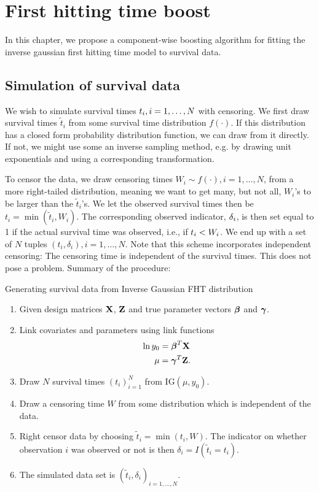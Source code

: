 \chapter{First hitting time boost}
In this chapter, we propose a component-wise boosting algorithm for fitting the inverse gaussian first hitting time model to survival data.

\section{Simulation of survival data}
We wish to simulate survival times $t_{i},i=1,\ldots,N$ with censoring. We first draw survival times $\tilde{t}_i$ from some survival time distribution $f(\cdot)$. If this distribution has a closed form probability distribution function, we can draw from it directly. If not, we might use some an inverse sampling method, e.g. by drawing unit exponentials and using a corresponding transformation.

To censor the data, we draw censoring times $W_i\sim f(\cdot),i=1,\ldots,N$, from a more right-tailed distribution, meaning we want to get many, but not all, $W_i$'s to be larger than the $\tilde{t}_i$'s. We let the observed survival times then be $t_i=\min(\tilde{t}_i,W_i)$.
The corresponding observed indicator, $\delta_{i}$, is then set equal to 1 if the actual survival time was observed, i.e., if $t_{i}<W_i$. We end up with a set of $N$ tuples $(t_i,\delta_i),i=1,\ldots,N$. Note that this scheme incorporates independent censoring: The censoring time is independent of the survival times. This does not pose a problem. Summary of the procedure:

\begin{algorithm}
\caption{Generating survival data from Inverse Gaussian FHT distribution}
\label{algo:FHT-sim}
\begin{enumerate}
    \item Given design matrices $\mathbf{X}$, $\mathbf{Z}$ and true parameter vectors $\boldsymbol{\beta}$ and $\boldsymbol{\gamma}$.
    \item Link covariates and parameters using link functions
        \begin{align*}
            \ln y_0&=\boldsymbol{\beta}^T\mathbf{X} \\
            \mu&=\boldsymbol{\gamma}^T\mathbf{Z}.
        \end{align*}
    \item Draw $N$ survival times $(t_i)_{i=1}^N$ from IG$(\mu,y_0)$.
    \item Draw a censoring time $W$ from some distribution which is independent of the data.
    \item Right censor data by choosing $\widetilde{t}_i=\min(t_i,W)$. The indicator on whether observation $i$ was observed or not is then $\delta_i=I(\widetilde{t}_i=t_i)$.
    \item The simulated data set is $(\widetilde{t}_i,\delta_i)_{i=1,\ldots,N}$.
\end{enumerate}
\end{algorithm}


